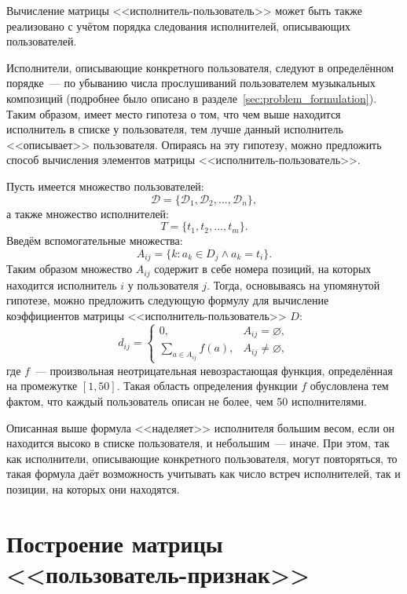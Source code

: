 Вычисление матрицы <<исполнитель-пользователь>> может быть
также реализовано с учётом порядка следования исполнителей,
описывающих пользователей. 

Исполнители, описывающие конкретного пользователя, следуют
в определённом порядке~--- по убыванию числа прослушиваний
пользователем музыкальных композиций (подробнее было описано
в разделе~\ref{sec:problem_formulation}). Таким образом,
имеет место гипотеза о том, что чем выше находится исполнитель
в списке у пользователя, тем лучше данный исполнитель
<<описывает>> пользователя. Опираясь на эту гипотезу, можно
предложить способ вычисления элементов матрицы
<<исполнитель-пользователь>>. 

Пусть имеется множество пользователей:
\[
    \mathcal{D} = \{\mathcal{D}_1, \mathcal{D}_2,..., \mathcal{D}_n\},
\]
а также множество исполнителей:
\[
    T = \{t_1, t_2,..., t_m\}.
\] 
Введём вспомогательные множества:
\[
    A_{ij} = \{k \colon a_k \in D_j \land a_k = t_i\}.
\]
Таким образом множество $A_{ij}$ содержит в себе номера
позиций, на которых находится исполнитель $i$ у
пользователя $j$. Тогда, основываясь на упомянутой гипотезе,
можно предложить следующую формулу для вычисление коэффициентов
матрицы <<исполнитель-пользователь>> $D$:
\begin{equation}\label{eq:order_dij}
    d_{ij} = \begin{cases}
          0,& A_{ij} = \varnothing,\\
          \sum\limits_{a \in A_{ij}}{f(a)},& A_{ij} \ne \varnothing,
      \end{cases}
\end{equation}
где $f$~--- произвольная неотрицательная невозрастающая функция,
определённая на промежутке $\left[1, 50\right]$. Такая область
определения функции $f$ обусловлена тем фактом, что каждый
пользователь описан не более, чем 50 исполнителями.

Описанная выше формула <<наделяет>> исполнителя большим
весом, если он находится высоко в списке пользователя, и
небольшим~--- иначе. При этом, так как исполнители,
описывающие конкретного пользователя, могут повторяться,
то такая формула даёт возможность учитывать как число
встреч исполнителей, так и позиции, на которых они находятся.

\section{Построение матрицы <<пользователь-признак>>}
\label{sec:step2_user_feature_matrix}

